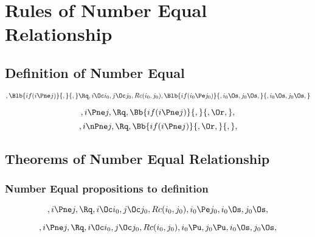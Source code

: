 \chapter{Rules of Number Equal Relationship}

\section{Definition of Number Equal}
\[,\Blb{if(i \Pne j)}{,}{,} \Rq , i \Oc i_0, j \Oc j_0, Rc(i_0, j_0), \Blb{if(i_0 \Pe j_0)}{,i_0 \Os, j_0 \Os, }{, i_0 \Os, j_0 \Os, }\]

\bigskip
\bigskip
\[, i \Pne j, \Rq , \Bb{if(i \Pne j)}{,}{, \Or,},\]
\bigskip
\bigskip
\[, i \nPne j, \Rq , \Bb{if(i \Pne j)}{, \Or,}{,},\]
\bigskip
\bigskip




\bigskip
\bigskip
\section{Theorems of  Number Equal Relationship}
\subsection{Number Equal propositions to definition}
\[,i \Pne j, \Rq ,  i \Oc i_0, j \Oc j_0, Rc(i_0, j_0), i_0 \Pe j_0, i_0 \Os, j_0 \Os,\]




\[,i \Pne j, \Rq ,  i \Oc i_0, j \Oc j_0, Rc(i_0, j_0), i_0 \Pu, j_0 \Pu, i_0 \Os, j_0 \Os,\]

